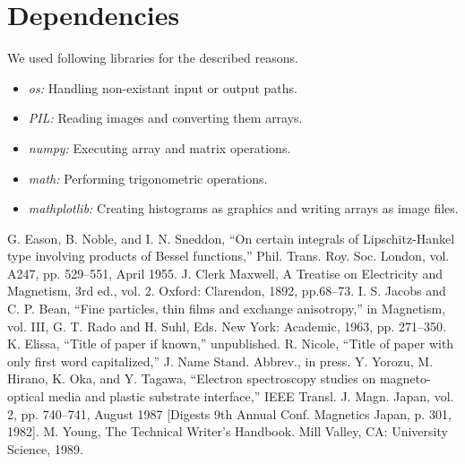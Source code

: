 \documentclass[conference]{IEEEtran}
\begin{document}
\section{Dependencies}
We used following libraries for the described reasons.
\begin{itemize}
	\item \textit{os:} Handling non-existant input or output paths.
	\item \textit{PIL:} Reading images and converting them arrays.
	\item \textit{numpy:} Executing array and matrix operations.
	\item \textit{math:} Performing trigonometric operations.
	\item \textit{mathplotlib:} Creating histograms as graphics and writing arrays as image files.
\end{itemize}

\begin{thebibliography}{00}
 G. Eason, B. Noble, and I. N. Sneddon, ``On certain integrals of Lipschitz-Hankel type involving products of Bessel functions,'' Phil. Trans. Roy. Soc. London, vol. A247, pp. 529--551, April 1955.
 J. Clerk Maxwell, A Treatise on Electricity and Magnetism, 3rd ed., vol. 2. Oxford: Clarendon, 1892, pp.68--73.
 I. S. Jacobs and C. P. Bean, ``Fine particles, thin films and exchange anisotropy,'' in Magnetism, vol. III, G. T. Rado and H. Suhl, Eds. New York: Academic, 1963, pp. 271--350.
 K. Elissa, ``Title of paper if known,'' unpublished.
 R. Nicole, ``Title of paper with only first word capitalized,'' J. Name Stand. Abbrev., in press.
 Y. Yorozu, M. Hirano, K. Oka, and Y. Tagawa, ``Electron spectroscopy studies on magneto-optical media and plastic substrate interface,'' IEEE Transl. J. Magn. Japan, vol. 2, pp. 740--741, August 1987 [Digests 9th Annual Conf. Magnetics Japan, p. 301, 1982].
 M. Young, The Technical Writer's Handbook. Mill Valley, CA: University Science, 1989.
\end{thebibliography}
\end{document}
